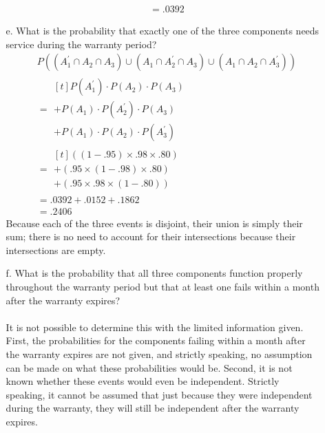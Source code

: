 \documentclass[letterpaper,12pt]{article}
\begin{document}
\begin{enumerate}
\begin{enumerate}
\begin{align*}
          &= .0392
        \end{align*}
      \item[e.]
        What is the probability that exactly one of the three components needs service during the warranty period?
        \begin{align*}
          &P((A_1^\prime \cap A_2 \cap A_3) \cup (A_1 \cap A_2^\prime \cap A_3) \cup (A_1 \cap A_2 \cap A_3^\prime)) \\
          &= \begin{aligned}[t]
            P(A_1^\prime) \cdot P(A_2) \cdot P(A_3) \\
            + P(A_1) \cdot P(A_2^\prime) \cdot P(A_3) \\
            + P(A_1) \cdot P(A_2) \cdot P(A_3^\prime)
          \end{aligned} \\
          &= \begin{aligned}[t]
            ((1 - .95) \times .98 \times .80) \\
            + (.95 \times (1 - .98) \times .80) \\
            + (.95 \times .98 \times (1 - .80))
          \end{aligned} \\
          &= .0392 + .0152 + .1862 \\
          &= .2406
        \end{align*}
        Because each of the three events is disjoint, their union is simply their sum; there is no need to account for their intersections because their intersections are empty.
      \item[f.]
        What is the probability that all three components function properly throughout the warranty period but that at least one fails within a month after the warranty expires?
        \\ \\
        It is not possible to determine this with the limited information given. First, the probabilities for the components failing within a month after the warranty expires are not given, and strictly speaking, no assumption can be made on what these probabilities would be. Second, it is not known whether these events would even be independent. Strictly speaking, it cannot be assumed that just because they were independent during the warranty, they will still be independent after the warranty expires.
    \end{enumerate}
\end{enumerate}
\end{document}

